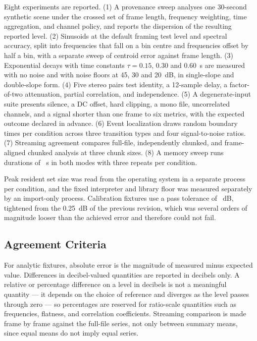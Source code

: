 \documentclass[final]{jaes}
\begin{document}
Eight experiments are reported. (1) A provenance sweep analyses one 30-second synthetic scene under the crossed set of frame length, frequency weighting, time aggregation, and channel policy, and reports the dispersion of the resulting reported level. (2) Sinusoids at the default framing test level and spectral accuracy, split into frequencies that fall on a bin centre and frequencies offset by half a bin, with a separate sweep of centroid error against frame length. (3) Exponential decays with time constants $\tau=0.15$, 0.30 and 0.60~s are measured with no noise and with noise floors at 45, 30 and 20~dB, in single-slope and double-slope form. (4) Five stereo pairs test identity, a 12-sample delay, a factor-of-two attenuation, partial correlation, and independence. (5) A degenerate-input suite presents silence, a DC offset, hard clipping, a mono file, uncorrelated channels, and a signal shorter than one frame to six metrics, with the expected outcome declared in advance. (6) Event localization draws \evtTrials{} random boundary times per condition across three transition types and four signal-to-noise ratios. (7) Streaming agreement compares full-file, independently chunked, and frame-aligned chunked analysis at three chunk sizes. (8) A memory sweep runs durations of \memDurations~s in both modes with three repeats per condition.

Peak resident set size was read from the operating system in a separate process per condition, and the fixed interpreter and library floor was measured separately by an import-only process. Calibration fixtures use a pass tolerance of \calTolerance~dB, tightened from the 0.25~dB of the previous revision, which was several orders of magnitude looser than the achieved error and therefore could not fail.

\subsection{Agreement Criteria}

For analytic fixtures, absolute error is the magnitude of measured minus expected value. Differences in decibel-valued quantities are reported in decibels only. A relative or percentage difference on a level in decibels is not a meaningful quantity --- it depends on the choice of reference and diverges as the level passes through zero --- so percentages are reserved for ratio-scale quantities such as frequencies, flatness, and correlation coefficients. Streaming comparison is made frame by frame against the full-file series, not only between summary means, since equal means do not imply equal series.
\end{document}
